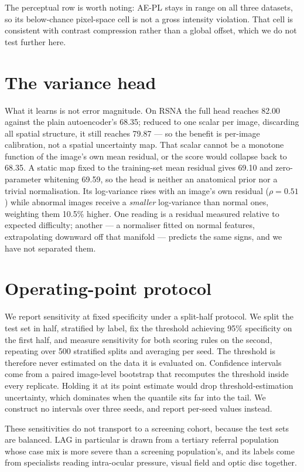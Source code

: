 \documentclass[pmlr,twocolumn,10pt]{jmlr} %
\begin{document}
The perceptual row is worth noting: AE-PL stays in range on all three datasets, so its
below-chance pixel-space cell is not a gross intensity violation. That cell is consistent
with contrast compression rather than a global offset, which we do not test further here.

\section{The variance head}
\label{apd:head}
What it learns is not error magnitude. On RSNA the full head reaches 82.00 against the plain
autoencoder's 68.35; reduced to one scalar per image, discarding all spatial structure, it
still reaches 79.87 --- so the benefit is per-image calibration, not a spatial uncertainty
map. That scalar cannot be a monotone function of the image's own mean residual, or the
score would collapse back to 68.35. A static map fixed to the training-set mean residual
gives 69.10 and zero-parameter whitening 69.59, so the head is neither an anatomical prior
nor a trivial normalisation. Its log-variance rises with an image's own residual
($\rho=0.51$) while abnormal images receive a \emph{smaller} log-variance than normal ones,
weighting them 10.5\% higher. One reading is a residual measured relative to expected
difficulty; another --- a normaliser fitted on normal features, extrapolating downward off
that manifold --- predicts the same signs, and we have not separated them.

\section{Operating-point protocol}
\label{apd:oppoint}
We report sensitivity at fixed specificity under a split-half protocol. We split the test
set in half, stratified by label, fix the threshold achieving 95\% specificity on the first
half, and measure sensitivity for both scoring rules on the second, repeating over 500
stratified splits and averaging per seed. The threshold is therefore never estimated on the
data it is evaluated on. Confidence intervals come from a paired image-level bootstrap that
recomputes the threshold inside every replicate. Holding it at its point estimate would
drop threshold-estimation uncertainty, which dominates when the quantile sits far into the
tail. We construct no intervals over three seeds, and report per-seed values instead.

These sensitivities do not transport to a screening cohort, because the test sets are
balanced.
LAG in particular is drawn from a tertiary referral population whose case mix is more
severe than a screening population's, and its labels come from specialists reading
intra-ocular pressure, visual field and optic disc together.


\end{document}
